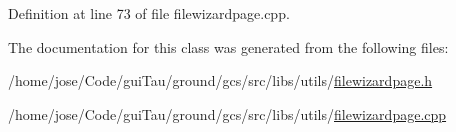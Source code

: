 Definition at line 73 of file filewizardpage.\-cpp.



The documentation for this class was generated from the following files\-:\begin{DoxyCompactItemize}
\item 
/home/jose/\-Code/gui\-Tau/ground/gcs/src/libs/utils/\hyperlink{filewizardpage_8h}{filewizardpage.\-h}\item 
/home/jose/\-Code/gui\-Tau/ground/gcs/src/libs/utils/\hyperlink{filewizardpage_8cpp}{filewizardpage.\-cpp}\end{DoxyCompactItemize}
